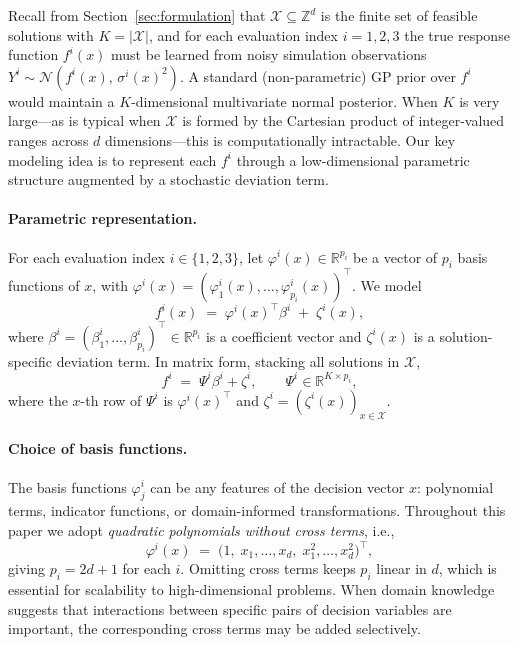 \documentclass[12pt]{article}
\theoremstyle{plain}
\theoremstyle{definition}
\theoremstyle{remark}
\begin{document}
Recall from Section~\ref{sec:formulation} that $\mathcal{X} \subseteq \mathbb{Z}^d$ is the finite set of feasible solutions with $K = |\mathcal{X}|$, and for each evaluation index $i = 1, 2, 3$ the true response function $f^i(x)$ must be learned from noisy simulation observations $Y^i \sim \mathcal{N}(f^i(x),\, \sigma^i(x)^2)$.
A standard (non-parametric) GP prior over $f^i$ would maintain a $K$-dimensional multivariate normal posterior. When $K$ is very large---as is typical when $\mathcal{X}$ is formed by the Cartesian product of integer-valued ranges across $d$ dimensions---this is computationally intractable. Our key modeling idea is to represent each $f^i$ through a low-dimensional parametric structure augmented by a stochastic deviation term.

\paragraph{Parametric representation.}
For each evaluation index $i \in \{1,2,3\}$, let
$\varphi^i(x) \in \mathbb{R}^{p_i}$ be a vector of $p_i$ basis
functions of $x$, with
$\varphi^i(x)=(\varphi^i_1(x), \ldots, \varphi^i_{p_i}(x))^\top$.
We model
\begin{equation}\label{eq:belief_model}
  f^i(x) \;=\; \varphi^i(x)^\top \beta^i \;+\; \zeta^i(x),
\end{equation}
where $\beta^i = (\beta^i_1, \ldots, \beta^i_{p_i})^\top \in \mathbb{R}^{p_i}$ is a coefficient vector and $\zeta^i(x)$ is a solution-specific deviation term. In matrix form, stacking all solutions in $\mathcal{X}$,
\begin{equation}\label{eq:belief_matrix}
  f^i \;=\; \Psi^i \beta^i + \zeta^i, \qquad \Psi^i \in \mathbb{R}^{K \times p_i},
\end{equation}
where the $x$-th row of $\Psi^i$ is $\varphi^i(x)^\top$ and $\zeta^i = (\zeta^i(x))_{x \in \mathcal{X}}$.

\paragraph{Choice of basis functions.}
The basis functions $\varphi^i_j$ can be any features of the decision vector $x$: polynomial terms, indicator functions, or domain-informed transformations. Throughout this paper we adopt \emph{quadratic polynomials without cross terms}, i.e.,
\begin{equation}\label{eq:quadratic_basis}
  \varphi^i(x) \;=\; \bigl(1,\; x_1,\ldots, x_d,\; x_1^2,\ldots, x_d^2\bigr)^\top,
\end{equation}
giving $p_i = 2d + 1$ for each $i$. Omitting cross terms keeps $p_i$ linear in $d$, which is essential for scalability to high-dimensional problems. When domain knowledge suggests that interactions between specific pairs of decision variables are important, the corresponding cross terms may be added selectively.
\end{document}
